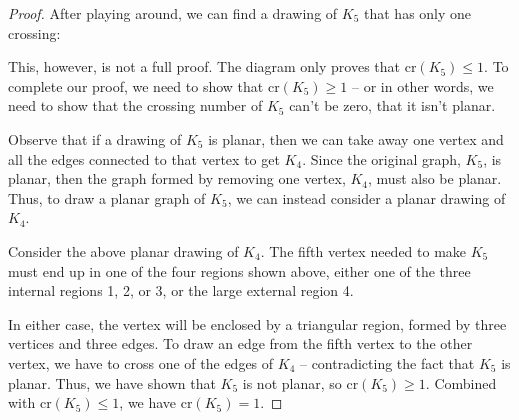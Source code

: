 \documentclass[11pt,paper=letter]{scrartcl}
\newcommand{\crs}[1]{\mathrm{cr}(#1)}
\begin{document}
\begin{proof}
After playing around, we can find a drawing of $K_5$ that has only one crossing:

\begin{center}
\end{center}

This, however, is not a full proof. The diagram only proves that $\crs{K_5} \leq 1$. To complete our proof, we need to show that $\crs{K_5} \geq 1$ -- or in other words, we need to show that the crossing number of $K_5$ can't be zero, that it isn't planar.

Observe that if a drawing of $K_5$ is planar, then we can take away one vertex and all the edges connected to that vertex to get $K_4$. Since the original graph, $K_5$, is planar, then the graph formed by removing one vertex, $K_4$, must also be planar. Thus, to draw a planar graph of $K_5$, we can instead consider a planar drawing of $K_4$.

\begin{center}
\end{center}

Consider the above planar drawing of $K_4$. The fifth vertex needed to make $K_5$ must end up in one of the four regions shown above, either one of the three internal regions 1, 2, or 3, or the large external region 4.

In either case, the vertex will be enclosed by a triangular region, formed by three vertices and three edges. To draw an edge from the fifth vertex to the other vertex, we have to cross one of the edges of $K_4$ -- contradicting the fact that $K_5$ is planar. Thus, we have shown that $K_5$ is not planar, so $\crs{K_5} \geq 1$. Combined with $\crs{K_5} \leq 1$, we have $\crs{K_5} = 1$.
\end{proof}
\end{document}
